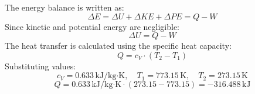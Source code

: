 The energy balance is written as:  
\[
\Delta E = \Delta U + \Delta KE + \Delta PE = Q - W
\]  
Since kinetic and potential energy are negligible:  
\[
\Delta U = Q - W
\]  
The heat transfer is calculated using the specific heat capacity:  
\[
Q = c_V \cdot (T_2 - T_1)
\]  
Substituting values:  
\[
c_V = 0.633 \, \text{kJ/kg·K}, \quad T_1 = 773.15 \, \text{K}, \quad T_2 = 273.15 \, \text{K}
\]  
\[
Q = 0.633 \, \text{kJ/kg·K} \cdot (273.15 - 773.15) = -316.488 \, \text{kJ}
\]